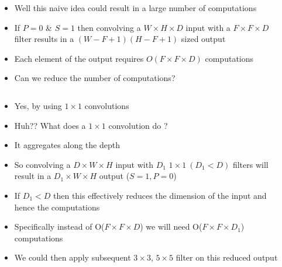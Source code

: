 \begin{frame}
	\begin{columns}
		\begin{overlayarea}{\textwidth}{\textheight}
			
		\end{overlayarea}
		\begin{overlayarea}{\textwidth}{\textheight}
			\begin{itemize}
				\justifying
				\item<1-> Well this naive idea could result in a large number of computations
				\item<2-> If $P=0$ \& $S=1$ then convolving a $W \times H \times D$ input with a 
				$F \times F \times D$ filter results in a $(W - F + 1)(H - F + 1)$ sized output
				\item<3-> Each element of the output requires $O(F \times F \times D)$ computations
				\item<4-> Can we reduce the number of computations?
			\end{itemize}
		\end{overlayarea}
	\end{columns}
\end{frame}


\begin{frame}
	\begin{columns}
		\column{0.5\textwidth}
		\begin{overlayarea}{\textwidth}{\textheight}
			
		\end{overlayarea}
		\column{0.5\textwidth}
		\begin{overlayarea}{\textwidth}{\textheight}
			\begin{itemize}
				\justifying
				\item<1-> Yes, by using $1 \times 1$ convolutions
				\item<2-> Huh?? What does a $1 \times 1$ convolution do ?
				\item<3-> It aggregates along the depth
				\item<4-> So convolving a $D \times W \times H$ input with $D_1$ $1 \times 1\ (D_1 < D)$ filters will result
				in a $D_1 \times W \times H$ output ($S=1, P=0$)
				\item<5-> If $D_1<D$ then this effectively reduces the dimension of the input and hence the computations
				\item<6-> Specifically instead of O($F\times F\times D$) we will need O($F\times F\times D_1$) computations
				\item<7-> We could then apply subsequent $3\times 3$, $5\times 5$ filter on this reduced output  
			\end{itemize}
		\end{overlayarea}
	\end{columns}
\end{frame}

